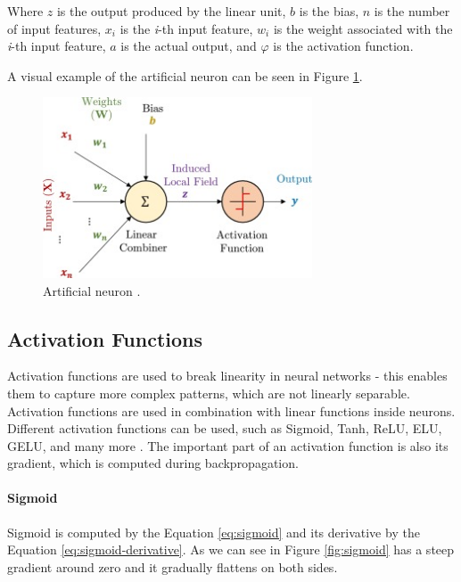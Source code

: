 Where $z$ is the output produced by the linear unit, $b$ is the bias, $n$ is the number of input features, $x_i$ is the \textit{i}-th input feature, $w_i$ is the weight associated with the \textit{i}-th input feature, $a$ is the actual output, and $\varphi$ is the activation function.

A visual example of the artificial neuron can be seen in Figure \ref{fig:artificial-neuron}.

\begin{figure}[H]
\begin{centering}
\includegraphics[width=8cm]{assets/images/neuron.jpg}
\par\end{centering}
\caption{Artificial neuron \cite{Santosh2022-1}.}
\label{fig:artificial-neuron}
\end{figure}

\subsection{Activation Functions}
Activation functions are used to break linearity in neural networks - this enables them to capture more complex patterns, which are not linearly separable. Activation functions are used in combination with linear functions inside neurons. Different activation functions can be used, such as Sigmoid, Tanh, ReLU, ELU, GELU, and many more \cite{Dubey2022, Aby2025}.  The important part of an activation function is also its gradient, which is computed during backpropagation. 

\paragraph{Sigmoid}
Sigmoid is computed by the Equation \ref{eq:sigmoid} and its derivative by the Equation \ref{eq:sigmoid-derivative}. As we can see in Figure \ref{fig:sigmoid} has a steep gradient around zero and it gradually flattens on both sides.

